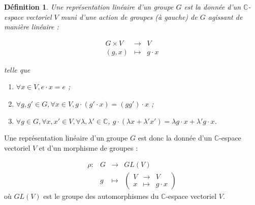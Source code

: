 \documentclass[french]{book}
\newtheorem{definition}{Définition}[section]
\begin{document}
\begin{definition}
  Une représentation linéaire d'un groupe $G$ est la donnée d'un $\mathbb{C}$-espace vectoriel $V$ muni d'une action de groupes (à gauche) de $G$ agissant de manière linéaire :

  \[\begin{matrix}
    G \times V & \longrightarrow & V \\
    (g,x) & \longmapsto & g \cdot x
  \end{matrix}\]

  telle que

  \begin{enumerate}
    \item $\forall x \in V, e \cdot x = e$ ;
    \item $\forall g, g' \in G, \forall x \in V, g \cdot (g' \cdot x) = (gg')\cdot x$ ;
    \item $\forall g \in G, \forall x,x' \in V, \forall \lambda, \lambda' \in \mathbb{C}$, $g \cdot (\lambda x+\lambda'x') = \lambda g \cdot x + \lambda' g \cdot x$.
  \end{enumerate}
\end{definition}

Une représentation linéaire d'un groupe $G$ est donc la donnée d'un $\mathbb{C}$-espace vectoriel $V$ et d'un morphisme de groupes :



\[\begin{matrix}
\rho : & G & \longrightarrow & GL(V) \\
\ & g & \longmapsto & \left(\begin{matrix}
 V & \longrightarrow & V \\
 x & \longmapsto & g \cdot x
\end{matrix}\right)
\end{matrix}\]
où $GL(V)$ est le groupe des automorphismes du $\mathbb{C}$-espace vectoriel $V$.
\end{document}
